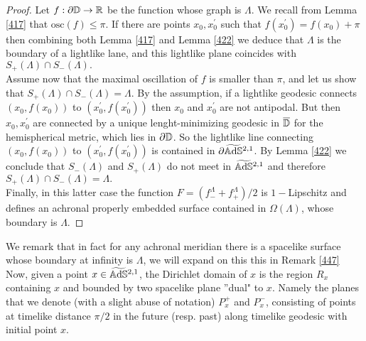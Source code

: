 \begin{proof}
    Let $f:\partial\mathbb{D}\to\mathbb{R}$ be the function whose graph is $\Lambda.$ We recall from Lemma \ref{417} that $\text{osc}(f)\leq\pi$. If there are points $x_0,x_0^{\prime}$ such that $f(x_0^{\prime})=f(x_0)+\pi$ then combining both Lemma \ref{417} and Lemma \ref{422} we deduce that $\Lambda$ is the boundary of a lightlike lane, and this lightlike plane coincides with $S_+(\Lambda)\cap S_-(\Lambda).$\\
    Assume now that the maximal oscillation of $f$ is smaller than $\pi$, and let us show that $S_+(\Lambda)\cap S_-(\Lambda)=\Lambda.$ By the assumption, if a lightlike geodesic connects $(x_0,f(x_0))$ to $(x_0^{\prime} ,f(x_0^{\prime}))$ then $x_0$ and $x_0^{\prime}$ are not antipodal. But then $x_0,x_0^{\prime}$ are connected by a unique lenght-minimizing geodesic in $\overline{\mathbb{D}}$ for the hemispherical metric, which lies in $\partial\mathbb{D}$. So the lightlike line connecting $(x_0,f(x_0))$ to $(x_0^{\prime},f(x_0^{\prime}))$ is contained in $\partial\widetilde{\mathbb{A}\mathrm{d}\mathbb{S}}{}^{2,1}$. By Lemma \ref{422} we conclude that $S_-(\Lambda)$ and $S_+(\Lambda)$ do not meet in $\widetilde{\mathbb{A}\mathrm{d}\mathbb{S}}{}^{2,1}$ and therefore $S_+(\Lambda)\cap S_-(\Lambda)=\Lambda.$\\
    Finally, in this latter case the function $F=(f^\Lambda_{-}+f^\Lambda_+)/2$ is $1-$Lipschitz and defines an achronal properly embedded surface contained in $\Omega(\Lambda)$, whose boundary is $\Lambda$. 
\end{proof}

We remark that in fact for any achronal meridian there is a spacelike surface whose boundary at infinity is $\Lambda$, we will expand on this this in Remark \ref{447}
Now, given a point $x \in \widetilde{\mathbb{A}\mathrm{d}\mathbb{S}}{}^{2,1}$, the Dirichlet domain of $x$ is the region $R_x$ containing $x$ and bounded by two spacelike plane ''dual" to $x$. Namely the planes that we denote (with a slight abuse of notation) $P_x^+$ and $P_x^-$, consisting of points at timelike distance $\pi/2$ in the future (resp. past) along timelike geodesic with initial point $x$.

